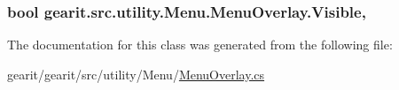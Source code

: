 \hypertarget{classgearit_1_1src_1_1utility_1_1_menu_1_1_menu_overlay_a5645f7842eeef693d50cc55e2fa20540}{
\subsubsection[{Visible}]{\setlength{\rightskip}{0pt plus 5cm}bool gearit.\+src.\+utility.\+Menu.\+Menu\+Overlay.\+Visible\hspace{0.3cm}{\ttfamily [get]}, {\ttfamily [set]}}}\label{classgearit_1_1src_1_1utility_1_1_menu_1_1_menu_overlay_a5645f7842eeef693d50cc55e2fa20540}


The documentation for this class was generated from the following file\+:\begin{DoxyCompactItemize}
\item 
gearit/gearit/src/utility/\+Menu/\hyperlink{_menu_overlay_8cs}{Menu\+Overlay.\+cs}\end{DoxyCompactItemize}
